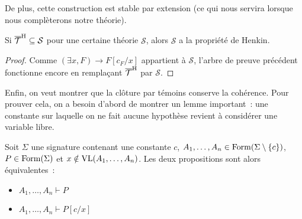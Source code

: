 De plus, cette construction est stable par extension (ce qui nous servira
lorsque nous complèterons notre théorie).

\begin{property}\label{prop.henkin.ext}
  Si $\overline{\mathcal T}^{\mathrm H}\subseteq \mathcal S$ pour une certaine théorie
  $\mathcal S$, alors $\mathcal S$ a la propriété de Henkin.
\end{property}

\begin{proof}
  Comme $(\exists x,F)\to F[c_F/x]$ appartient à $\mathcal S$, l'arbre de preuve
  précédent fonctionne encore en remplaçant $\overline{\mathcal T}^{\mathrm H}$ par
  $\mathcal S$.
\end{proof}

Enfin, on veut montrer que la clôture par témoins conserve la cohérence. Pour
prouver cela, on a besoin d'abord de montrer un lemme important~: une constante
sur laquelle on ne fait aucune hypothèse revient à considérer une variable
libre.

\begin{lemma}\label{lem.var.const}
  Soit $\Sigma$ une signature contenant une constante $c$,
  $A_1,\ldots,A_n\in\operatorname{Form}(\Sigma\setminus\{c\})$, $P\in\operatorname{Form}(\Sigma)$ et
  $x\notin \operatorname{VL}(A_1,\ldots,A_n)$.
  Les deux propositions sont alors équivalentes~:
  \begin{itemize}
  \item $A_1,\ldots,A_n\vdash P$
  \item $A_1,\ldots,A_n\vdash P[c/x]$
  \end{itemize}
\end{lemma}

